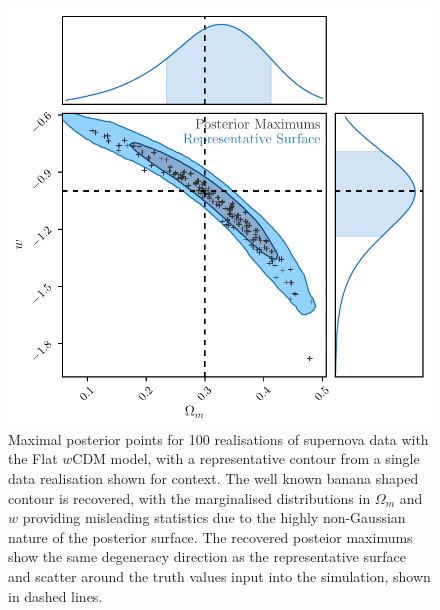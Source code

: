 \documentclass[a4paper,fleqn,usenatbib]{mnras}
\begin{document}
\begin{figure}
	\begin{center}
		\includegraphics[width=\columnwidth]{simpleApproximateModelW.pdf}
	\end{center}
	\caption{Maximal posterior points for 100 realisations of supernova data with the Flat $w$CDM model, with a representative contour from a single data realisation shown for context. The well known banana shaped contour is recovered, with the marginalised distributions in $\Omega_m$ and $w$ providing misleading statistics due to the highly non-Gaussian nature of the posterior surface. The recovered posteior maximums show the same degeneracy direction as the representative surface and scatter around the truth values input into the simulation, shown in dashed lines.}
	\label{fig:simple_w}
\end{figure}
\end{document}
